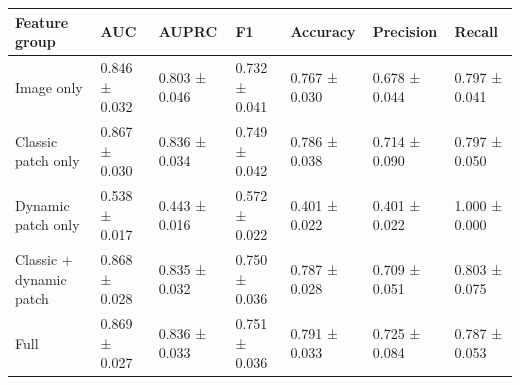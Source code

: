 \begin{tabular}{lllllll}
\toprule
Feature group & AUC & AUPRC & F1 & Accuracy & Precision & Recall \\
\midrule
Image only & 0.846 ± 0.032 & 0.803 ± 0.046 & 0.732 ± 0.041 & 0.767 ± 0.030 & 0.678 ± 0.044 & 0.797 ± 0.041 \\
Classic patch only & 0.867 ± 0.030 & 0.836 ± 0.034 & 0.749 ± 0.042 & 0.786 ± 0.038 & 0.714 ± 0.090 & 0.797 ± 0.050 \\
Dynamic patch only & 0.538 ± 0.017 & 0.443 ± 0.016 & 0.572 ± 0.022 & 0.401 ± 0.022 & 0.401 ± 0.022 & 1.000 ± 0.000 \\
Classic + dynamic patch & 0.868 ± 0.028 & 0.835 ± 0.032 & 0.750 ± 0.036 & 0.787 ± 0.028 & 0.709 ± 0.051 & 0.803 ± 0.075 \\
Full & 0.869 ± 0.027 & 0.836 ± 0.033 & 0.751 ± 0.036 & 0.791 ± 0.033 & 0.725 ± 0.084 & 0.787 ± 0.053 \\
\bottomrule
\end{tabular}
